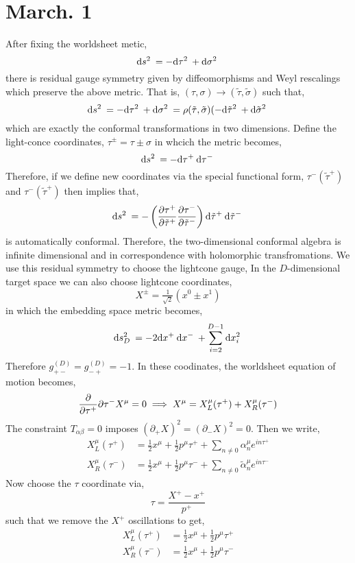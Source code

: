 \documentclass[12pt]{extarticle}
\begin{document}
\section{March. 1}

After fixing the worldsheet metic,
\[ \mathrm{d}s^2 \: = - \mathrm{d}\tau^2 \: + \mathrm{d}\sigma^2 \: \]
there is residual gauge symmetry given by diffeomorphisms and Weyl rescalings which preserve the above metric. That is, $(\tau, \sigma) \to (\tilde{\tau}, \tilde{\sigma})$ such that,
\[ \mathrm{d}s^2 \: = - \mathrm{d}\tau^2 \: + \mathrm{d}\sigma^2 \: = \rho(\tilde{\tau}, \tilde{\sigma}) (- \mathrm{d}\tilde{\tau}^2 \: + \mathrm{d}\tilde{\sigma}^2 \: \]
which are exactly the conformal transformations in two dimensions. Define the light-conce coordinates, $\tau^{\pm} = \tau \pm \sigma$ in whcich the metric becomes,
\[ \mathrm{d}s^2 \: = - \mathrm{d}\tau^+ \: \mathrm{d}\tau^- \: \]
Therefore, if we define new coordinates via the special functional form, $\tau^{-}(\tilde{\tau}^+)$ and $\tau^{-}(\tilde{\tau}^{+})$ then implies that,
\[ \mathrm{d}s^2 \: = - \left( \frac{\partial{\tau^+}}{\partial{\tilde{\tau}^+}} \frac{\partial{\tau^-}}{\partial{\tilde{\tau}^-}} \right) \mathrm{d}\tilde{\tau}^+ \: \mathrm{d}\tilde{\tau}^- \: \]
is automatically conformal. Therefore, the two-dimensional conformal algebra is infinite dimensional and in correspondence with holomorphic transfromations. We use this residual symmetry to choose the lightcone gauge,
In the $D$-dimensional target space we can also choose lightcone coordinates,
\[ X^{\pm} = \tfrac{1}{\sqrt{2}} (x^0 \pm x^1) \]
in which the embedding space metric becomes,
\[ \mathrm{d}s_D^2 \: = - 2 \mathrm{d}x^+ \: \mathrm{d}x^- \: + \sum_{i = 2}^{D-1} \mathrm{d}x_i^2 \: \] 
Therefore $g^{(D)}_{+-} = g^{(D)}_{-+} = -1$. In these coodinates, the worldsheet equation of motion becomes,
\[ \frac{\partial{}}{\partial{\tau^+}} \partial{}{\tau^-} X^\mu = 0 \implies X^\mu = X_L^\mu(\tau^+) + X_R^\mu(\tau^-) \]
The constraint $T_{\alpha \beta} = 0$ imposes $(\partial_{+} X)^2 = (\partial_{-} X)^2 = 0$. Then we write,
\begin{align*}
X_L^\mu(\tau^+) & = \tfrac{1}{2} x^\mu + \tfrac{1}{2} p^\mu \tau^{+} + \sum_{n \neq 0} \alpha_n^\mu e^{i n \tau^+}
\\
X_R^\mu(\tau^-) & = \tfrac{1}{2} x^\mu + \tfrac{1}{2} p^\mu \tau^{-} + \sum_{n \neq 0} \tilde{\alpha}_n^\mu e^{i n \tau^-}  
\end{align*}
Now choose the $\tau$ coordinate via,
\[ \tau = \frac{X^+ - x^+}{p^+} \]
such that we remove the $X^+$ oscillations to get,
\begin{align*}
X_L^\mu(\tau^+) & = \tfrac{1}{2} x^\mu + \tfrac{1}{2} p^\mu \tau^{+} 
\\
X_R^\mu(\tau^-) & = \tfrac{1}{2} x^\mu + \tfrac{1}{2} p^\mu \tau^{-} 
\end{align*}
\end{document}
